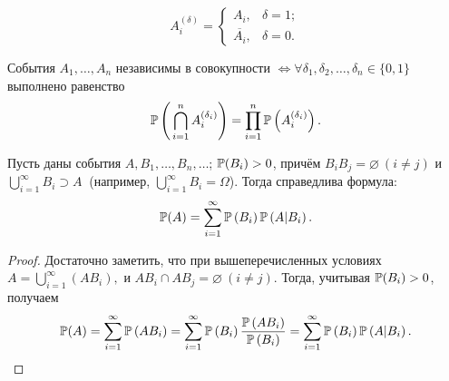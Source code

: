 \begin{symb}
	\begin{equation*}
		A_{i}^{(\delta)} =
		\begin{cases}
			A_{i},            & \delta = 1; \\
			\overline{A_{i}}, & \delta = 0. 
		\end{cases}
	\end{equation*}
\end{symb}

\begin{namedthm}
    События $A_1, \ldots, A_n$ независимы в совокупности $\iff \forall \delta_1, \delta_2, \ldots, \delta_n \in \{0, 1\}$ выполнено равенство
	\begin{equation*}
		\operatorname{\mathbb{P}}\left(\, \bigcap_{i=1}^{n} A_{i}^{\left( \delta_{i} \right)} \right)
		= \prod_{i=1}^{n}\operatorname{\mathbb{P}}\left( A_{i}^{\left(\delta_{i}\right)} \right).
	\end{equation*}
\end{namedthm}

\begin{namedthm}
	Пусть даны события $A, B_1, \ldots, B_n, \ldots$; $\operatorname{\mathbb{P}}(B_i) > 0$, причём $B_i B_j = \varnothing~(i \neq j)$ и $\bigcup\limits_{i=1}^{\infty}B_i \supset A~$ (например, $\bigcup\limits_{i=1}^{\infty}B_i = \Omega$). 
	Тогда справедлива формула:
	\begin{equation*}
		\operatorname{\mathbb{P}}(A)=\sum\limits_{i=1}^{\infty} \operatorname{\mathbb{P}}\left(B_{i}\right) \operatorname{\mathbb{P}}\left(A | B_{i}\right).
	\end{equation*}
\end{namedthm}

\begin{proof}
	Достаточно заметить, что при вышеперечисленных условиях $A = \bigcup\limits_{i=1}^{\infty}(AB_i),$ и $AB_i \cap AB_j = \varnothing ~(i \neq j).$ 
	Тогда, учитывая $\operatorname{\mathbb{P}}(B_i) > 0$, получаем
	\begin{equation*}
		\operatorname{\mathbb{P}}(A)=\sum\limits_{i=1}^{\infty} \operatorname{\mathbb{P}}\left(A B_{i}\right)=\sum\limits_{i=1}^{\infty} \operatorname{\mathbb{P}}\left(B_{i}\right) \frac{\operatorname{\mathbb{P}}\left(A B_{i}\right)}{\operatorname{\mathbb{P}}\left(B_{i}\right)}=\sum\limits_{i=1}^{\infty} \operatorname{\mathbb{P}}\left(B_{i}\right) \operatorname{\mathbb{P}}\left(A | B_{i}\right). \qedhere
	\end{equation*}
\end{proof}

